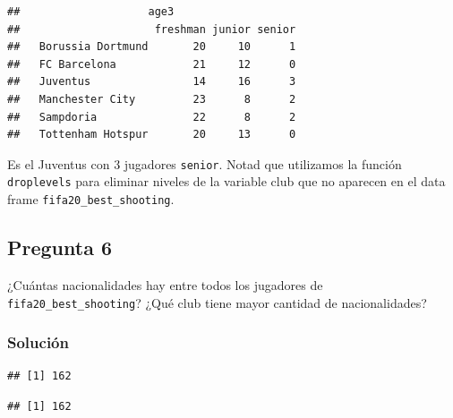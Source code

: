 \documentclass[]{article}
\newenvironment{Shaded}{\begin{snugshade}}{\end{snugshade}}
\newcommand{\KeywordTok}[1]{\textcolor[rgb]{0.13,0.29,0.53}{\textbf{#1}}}
\newcommand{\NormalTok}[1]{#1}
\newcommand{\OperatorTok}[1]{\textcolor[rgb]{0.81,0.36,0.00}{\textbf{#1}}}
\begin{document}
\begin{verbatim}
##                    age3
##                     freshman junior senior
##   Borussia Dortmund       20     10      1
##   FC Barcelona            21     12      0
##   Juventus                14     16      3
##   Manchester City         23      8      2
##   Sampdoria               22      8      2
##   Tottenham Hotspur       20     13      0
\end{verbatim}

Es el Juventus con 3 jugadores \texttt{senior}. Notad que utilizamos la
función \texttt{droplevels} para eliminar niveles de la variable club
que no aparecen en el data frame \texttt{fifa20\_best\_shooting}.

\hypertarget{pregunta-6}{%
\subsection{Pregunta 6}\label{pregunta-6}}

¿Cuántas nacionalidades hay entre todos los jugadores de
\texttt{fifa20\_best\_shooting}? ¿Qué club tiene mayor cantidad de
nacionalidades?

\hypertarget{soluciuxf3n-5}{%
\subsubsection{Solución}\label{soluciuxf3n-5}}

\begin{Shaded}
\end{Shaded}

\begin{verbatim}
## [1] 162
\end{verbatim}

\begin{Shaded}
\end{Shaded}

\begin{verbatim}
## [1] 162
\end{verbatim}
\end{document}
